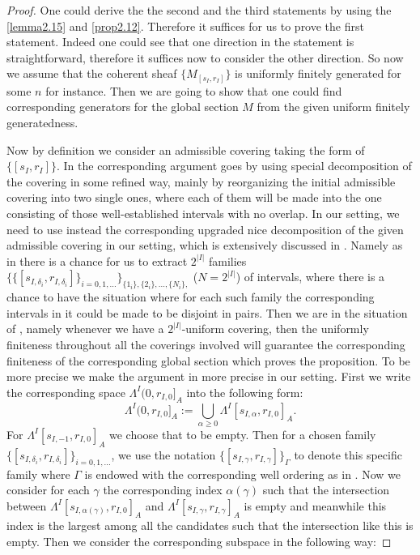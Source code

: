 \documentclass[12pt]{amsart}
\theoremstyle{definition}
\numberwithin{equation}{section}
\begin{document}
\begin{proof}
One could derive the the second and the third statements by using the \cref{lemma2.15} and \cref{prop2.12}. Therefore it suffices for us to prove the first statement. Indeed one could see that one direction in the statement is straightforward, therefore it suffices now to consider the other direction. So now we assume that the coherent sheaf $\{M_{[s_I,r_I]}\}$ is uniformly finitely generated for some $n$ for instance. Then we are going to show that one could find corresponding generators for the global section $M$ from the given uniform finitely generatedness. 

Now by definition we consider an admissible covering taking the form of $\{[s_I,r_I]\}$. In \cite[Proposition 2.1.13]{KPX} the corresponding argument goes by using special decomposition of the covering in some refined way, mainly by reorganizing the initial admissible covering into two single ones, where each of them will be made into the one consisting of those well-established intervals with no overlap. In our setting, we need to use instead the corresponding upgraded nice decomposition of the given admissible covering in our setting, which is extensively discussed in \cite[2.6.14-2.6.17]{KL2}. Namely as in \cite[2.6.14-2.6.17]{KL2} there is a chance for us to extract $2^{|I|}$ families $\{\{[s_{I,\delta_i},r_{I,\delta_i}]\}_{i=0,1,...}\}_{\{1_i\},\{2_i\},...,\{N_i\},}$ ($N=2^{|I|}$) of intervals, where there is a chance to have the situation where for each such family the corresponding intervals in it could be made to be disjoint in pairs. Then we are in the situation of \cite[Proposition 2.6.17]{KL2}, namely whenever we have a $2^{|I|}$-uniform covering, then the uniformly finiteness throughout all the coverings involved will guarantee the corresponding finiteness of the corresponding global section which proves the proposition. To be more precise we make the argument in \cite[Proposition 2.6.17]{KL2} more precise in our setting. First we write the corresponding space $\Lambda^I(0,r_{I,0}]_A$ into the following form:
\begin{displaymath}
\Lambda^I(0,r_{I,0}]_A:=\bigcup_{\alpha\geq 0} \Lambda^I[s_{I,\alpha},r_{I,0}]_A.	
\end{displaymath}
For $\Lambda^I[s_{I,-1},r_{I,0}]_A$ we choose that to be empty. Then for a chosen family $\{[s_{I,\delta_i},r_{I,\delta_i}]\}_{i=0,1,...}$, we use the notation $\{[s_{I,\gamma},r_{I,\gamma}]\}_{\Gamma}$ to denote this specific family where $\Gamma$ is endowed with the corresponding well ordering as in \cite[proposition 2.6.17]{KL2}. Now we consider for each $\gamma$ the corresponding index $\alpha(\gamma)$ such that the intersection between $\Lambda^I[s_{I,\alpha(\gamma)},r_{I,0}]_A$ and $\Lambda^I[s_{I,\gamma},r_{I,\gamma}]_A$ is empty and meanwhile this index is the largest among all the candidates such that the intersection like this is empty. Then we consider the corresponding subspace in the following way:

\end{proof}
\end{document}
